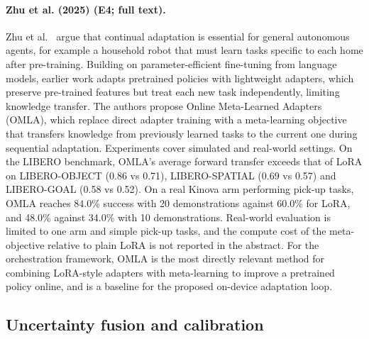 \documentclass[10pt,a4paper]{article}
\begin{document}
\paragraph{Zhu et al. (2025) (E4; full text).} Zhu et al.~\cite{Zhu2025} argue that continual adaptation is essential for general autonomous agents, for example a household robot that must learn tasks specific to each home after pre-training. Building on parameter-efficient fine-tuning from language models, earlier work adapts pretrained policies with lightweight adapters, which preserve pre-trained features but treat each new task independently, limiting knowledge transfer. The authors propose Online Meta-Learned Adapters (OMLA), which replace direct adapter training with a meta-learning objective that transfers knowledge from previously learned tasks to the current one during sequential adaptation. Experiments cover simulated and real-world settings. On the LIBERO benchmark, OMLA's average forward transfer exceeds that of LoRA on LIBERO-OBJECT (0.86 vs 0.71), LIBERO-SPATIAL (0.69 vs 0.57) and LIBERO-GOAL (0.58 vs 0.52). On a real Kinova arm performing pick-up tasks, OMLA reaches 84.0\% success with 20 demonstrations against 60.0\% for LoRA, and 48.0\% against 34.0\% with 10 demonstrations. Real-world evaluation is limited to one arm and simple pick-up tasks, and the compute cost of the meta-objective relative to plain LoRA is not reported in the abstract. For the orchestration framework, OMLA is the most directly relevant method for combining LoRA-style adapters with meta-learning to improve a pretrained policy online, and is a baseline for the proposed on-device adaptation loop.

\subsection*{Uncertainty fusion and calibration}
\end{document}

